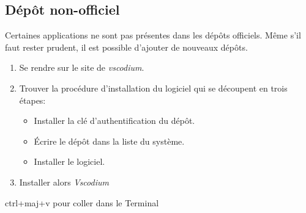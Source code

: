 \documentclass[a4paper,11pt]{article}
\begin{document}
\subsection{Dépôt non-officiel}
Certaines applications ne sont pas présentes dans les dépôts officiels. Même s'il faut rester prudent, il est possible d'ajouter de nouveaux dépôts.
\begin{activite}
\begin{enumerate}
    \item Se rendre sur le site de \emph{vscodium}.
    \item Trouver la procédure d'installation du logiciel qui se découpent en trois étapes:
    \begin{itemize}
        \item Installer la clé d'authentification du dépôt.
        \item Écrire le dépôt dans la liste du système.
        \item Installer le logiciel.
    \end{itemize}
    \item Installer alors \emph{Vscodium}
\end{enumerate}
\end{activite}
\begin{commentprof}
ctrl+maj+v pour coller dans le Terminal
\end{commentprof}
\end{document}
